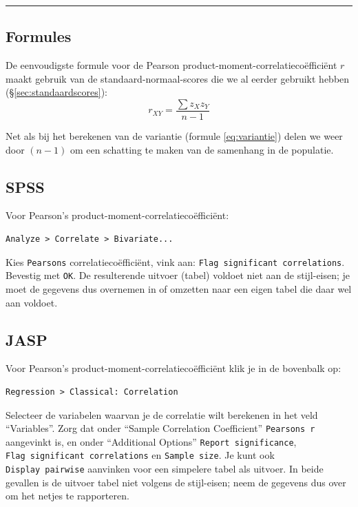 \documentclass[
]{book}
\begin{document}
\begin{center}\rule{0.5\linewidth}{0.5pt}\end{center}

\subsection{Formules}\label{formules-3}

De eenvoudigste formule voor de Pearson
product-moment-correlatiecoëfficiënt \(r\) maakt gebruik van de
standaard-normaal-scores die we al eerder gebruikt hebben
(§\ref{sec:standaardscores}):
\begin{equation}
    r_{XY} = \frac{\sum z_X z_Y}{n-1}
  \label{eq:pearson}
\end{equation}

Net als bij het berekenen van de variantie
(formule \eqref{eq:variantie}) delen we weer door \((n-1)\) om een schatting
te maken van de samenhang in de populatie.

\subsection{SPSS}\label{spss-5}

Voor Pearson's product-moment-correlatiecoëfficiënt:

\begin{verbatim}
Analyze > Correlate > Bivariate...
\end{verbatim}

Kies \texttt{Pearsons} correlatiecoëfficiënt, vink aan:
\texttt{Flag\ significant\ correlations}. Bevestig met \texttt{OK}. De resulterende
uitvoer (tabel) voldoet niet aan de stijl-eisen; je moet de gegevens dus
overnemen in of omzetten naar een eigen tabel die daar wel aan voldoet.

\subsection{JASP}\label{jasp-7}

Voor Pearson's product-moment-correlatiecoëfficiënt klik je in de bovenbalk op:

\begin{verbatim}
Regression > Classical: Correlation
\end{verbatim}

Selecteer de variabelen waarvan je de correlatie wilt berekenen in het veld ``Variables''. Zorg dat onder ``Sample Correlation Coefficient'' \texttt{Pearson\textquotesingle{}s\ r} aangevinkt is, en onder ``Additional Options'' \texttt{Report\ significance}, \texttt{Flag\ significant\ correlations} en \texttt{Sample\ size}. Je kunt ook \texttt{Display\ pairwise} aanvinken voor een simpelere tabel als uitvoer. In beide gevallen is de uitvoer tabel niet volgens de stijl-eisen; neem de gegevens dus over om het netjes te rapporteren.
\end{document}
